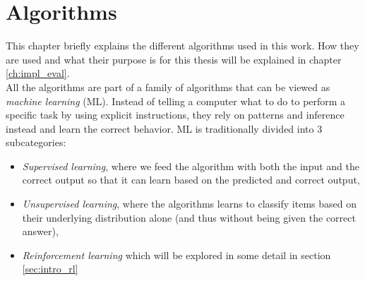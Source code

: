 \chapter{Algorithms}
\label{ch:algorithms}

This chapter briefly explains the different algorithms used in this work. How they are used and what their purpose is for this thesis will be explained in chapter \ref{ch:impl_eval}.\\
All the algorithms are part of a family of algorithms that can be viewed as \emph{machine learning} (ML). Instead of telling a computer what to do to perform a specific task by using explicit instructions, they rely on patterns and inference instead and learn the correct behavior. ML is traditionally divided into 3 subcategories:
\begin{itemize}
    \item \emph{Supervised learning}, where we feed the algorithm with both the input and the correct output so that it can learn based on the predicted and correct output,
    \item \emph{Unsupervised learning}, where the algorithms learns to classify items based on their underlying distribution alone (and thus without being given the correct answer),
    \item \emph{Reinforcement learning} which will be explored in some detail in section \ref{sec:intro_rl}
\end{itemize}


